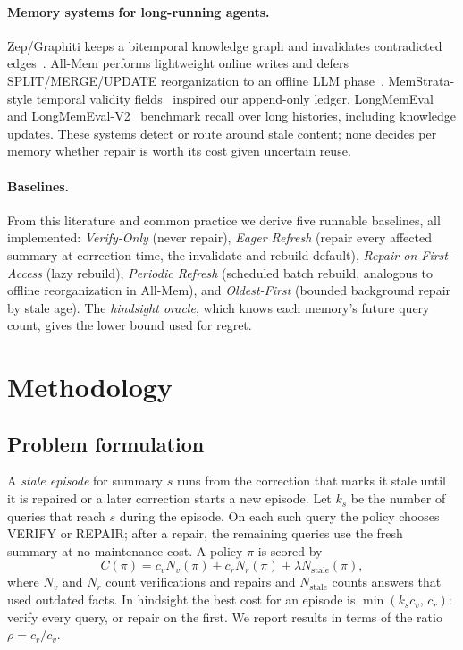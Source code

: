\documentclass{article}
\begin{document}
\paragraph{Memory systems for long-running agents.} Zep/Graphiti keeps a
bitemporal knowledge graph and invalidates contradicted
edges~\citep{rasmussen2025zep}. All-Mem performs lightweight online writes and
defers SPLIT/MERGE/UPDATE reorganization to an offline LLM
phase~\citep{lv2026allmem}. MemStrata-style temporal validity
fields~\citep{yadav2026memstrata} inspired our append-only ledger.
LongMemEval~\citep{wu2025longmemeval} and
LongMemEval-V2~\citep{wu2026longmemevalv2} benchmark recall over long
histories, including knowledge updates. These systems detect or route around
stale content; none decides per memory whether repair is worth its cost given
uncertain reuse.

\paragraph{Baselines.} From this literature and common practice we derive
five runnable baselines, all implemented: \emph{Verify-Only} (never repair),
\emph{Eager Refresh} (repair every affected summary at correction time, the
invalidate-and-rebuild default), \emph{Repair-on-First-Access} (lazy rebuild),
\emph{Periodic Refresh} (scheduled batch rebuild, analogous to offline
reorganization in All-Mem), and \emph{Oldest-First} (bounded background repair
by stale age). The \emph{hindsight oracle}, which knows each memory's future
query count, gives the lower bound used for regret.

\section{Methodology}

\subsection{Problem formulation}
A \emph{stale episode} for summary $s$ runs from the correction that marks it
stale until it is repaired or a later correction starts a new episode. Let
$k_s$ be the number of queries that reach $s$ during the episode. On each such
query the policy chooses VERIFY or REPAIR; after a repair, the remaining
queries use the fresh summary at no maintenance cost. A policy $\pi$ is scored by
\begin{equation}
C(\pi) = c_v N_v(\pi) + c_r N_r(\pi) + \lambda N_{\mathrm{stale}}(\pi),
\label{eq:cost}
\end{equation}
where $N_v$ and $N_r$ count verifications and repairs and $N_{\mathrm{stale}}$
counts answers that used outdated facts. In hindsight the best cost for an
episode is $\min(k_s c_v,\, c_r)$: verify every query, or repair on the first.
We report results in terms of the ratio $\rho=c_r/c_v$.
\end{document}

